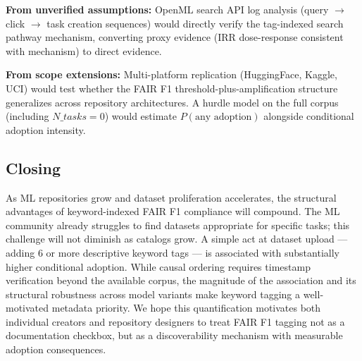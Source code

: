 \textbf{From unverified assumptions:} OpenML search API log analysis (query $\rightarrow$ click $\rightarrow$ task creation sequences) would directly verify the tag-indexed search pathway mechanism, converting proxy evidence (IRR dose-response consistent with mechanism) to direct evidence.

\textbf{From scope extensions:} Multi-platform replication (HuggingFace, Kaggle, UCI) would test whether the FAIR F1 threshold-plus-amplification structure generalizes across repository architectures. A hurdle model on the full corpus (including $N\_tasks=0$) would estimate $P(\text{any adoption})$ alongside conditional adoption intensity.

\subsection{Closing}

As ML repositories grow and dataset proliferation accelerates, the structural advantages of keyword-indexed FAIR F1 compliance will compound. The ML community already struggles to find datasets appropriate for specific tasks; this challenge will not diminish as catalogs grow. A simple act at dataset upload --- adding 6 or more descriptive keyword tags --- is associated with substantially higher conditional adoption. While causal ordering requires timestamp verification beyond the available corpus, the magnitude of the association and its structural robustness across model variants make keyword tagging a well-motivated metadata priority. We hope this quantification motivates both individual creators and repository designers to treat FAIR F1 tagging not as a documentation checkbox, but as a discoverability mechanism with measurable adoption consequences.
